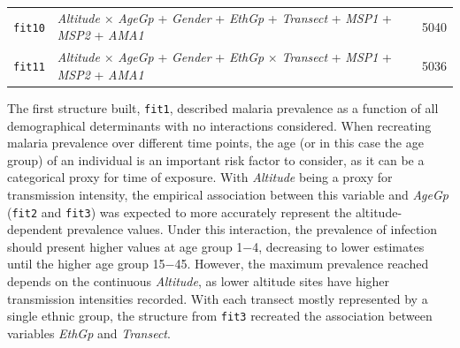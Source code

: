 \begin{table}[ht!]
\begin{adjustbox}{width=\linewidth}
\begin{tabular}{llc}
\texttt{fit10}   & \textit{Altitude} $\times$ \textit{AgeGp} + \textit{Gender} + \textit{EthGp} + \textit{Transect} + \textit{MSP1} + \textit{MSP2} + \textit{AMA1}   & 5040   \\
\texttt{fit11}   & \textit{Altitude} $\times$ \textit{AgeGp} + \textit{Gender} + \textit{EthGp} $\times$ \textit{Transect} + \textit{MSP1} + \textit{MSP2} + \textit{AMA1}   & 5036   \\
\bottomrule
\end{tabular}
\end{adjustbox}
\end{table}

The first structure built, \texttt{fit1}, described malaria prevalence as a function of all demographical determinants with no interactions considered.
When recreating malaria prevalence over different time points, the age (or in this case the age group) of an individual is an important risk factor to consider, as it can be a categorical proxy for time of exposure.
With \textit{Altitude} being a proxy for transmission intensity, the empirical association between this variable and \textit{AgeGp} (\texttt{fit2} and \texttt{fit3}) was expected to more accurately represent the altitude-dependent prevalence values.
Under this interaction, the prevalence of infection should present higher values at age group 1$-$4, decreasing to lower estimates until the higher age group 15$-$45.
However, the maximum prevalence reached depends on the continuous \textit{Altitude}, as lower altitude sites have higher transmission intensities recorded.
With each transect mostly represented by a single ethnic group, the structure from \texttt{fit3} recreated the association between variables \textit{EthGp} and \textit{Transect}.

